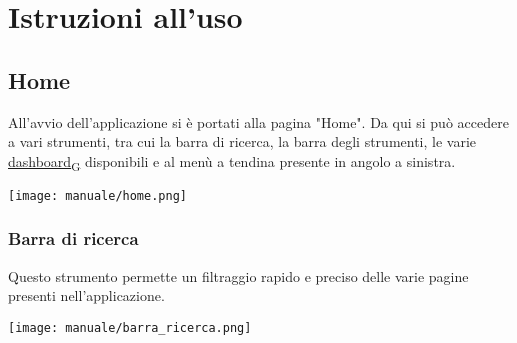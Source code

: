 \section{Istruzioni all'uso}
\subsection{Home}
All'avvio dell'applicazione si è portati alla pagina "Home". Da qui si può accedere a vari strumenti, tra cui la barra di ricerca, la barra degli strumenti, le varie \href{https://7last.github.io/docs/pb/documentazione-interna/glossario\#dashboard}{dashboard\textsubscript{G}} disponibili e al menù a tendina presente in angolo a sinistra.
\begin{center}
    \texttt{[image: manuale/home.png]}
\end{center}
\newpage
\subsubsection{Barra di ricerca}
Questo strumento permette un filtraggio rapido e preciso delle varie pagine presenti nell'applicazione. 
\begin{center}
    \texttt{[image: manuale/barra\_ricerca.png]}
\end{center}

